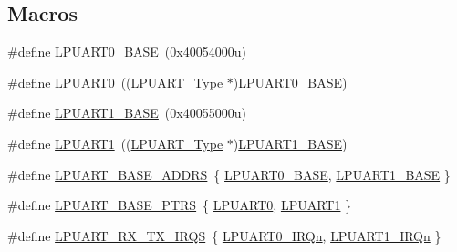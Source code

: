 \subsection*{Macros}
\begin{DoxyCompactItemize}
\item 
\#define \mbox{\hyperlink{group___l_p_u_a_r_t___peripheral___access___layer_ga8d65c662026d150cdf0aa1e586fde2cb}{L\+P\+U\+A\+R\+T0\+\_\+\+B\+A\+SE}}~(0x40054000u)
\item 
\#define \mbox{\hyperlink{group___l_p_u_a_r_t___peripheral___access___layer_ga5b2895bb50a19a21ddb954c28977629b}{L\+P\+U\+A\+R\+T0}}~((\mbox{\hyperlink{struct_l_p_u_a_r_t___type}{L\+P\+U\+A\+R\+T\+\_\+\+Type}} $\ast$)\mbox{\hyperlink{group___l_p_u_a_r_t___peripheral___access___layer_ga8d65c662026d150cdf0aa1e586fde2cb}{L\+P\+U\+A\+R\+T0\+\_\+\+B\+A\+SE}})
\item 
\#define \mbox{\hyperlink{group___l_p_u_a_r_t___peripheral___access___layer_ga42584c807077cea9525819eaf29c7e34}{L\+P\+U\+A\+R\+T1\+\_\+\+B\+A\+SE}}~(0x40055000u)
\item 
\#define \mbox{\hyperlink{group___l_p_u_a_r_t___peripheral___access___layer_ga73eb37d103f4e4f2d18ec3d3f5208ab9}{L\+P\+U\+A\+R\+T1}}~((\mbox{\hyperlink{struct_l_p_u_a_r_t___type}{L\+P\+U\+A\+R\+T\+\_\+\+Type}} $\ast$)\mbox{\hyperlink{group___l_p_u_a_r_t___peripheral___access___layer_ga42584c807077cea9525819eaf29c7e34}{L\+P\+U\+A\+R\+T1\+\_\+\+B\+A\+SE}})
\item 
\#define \mbox{\hyperlink{group___l_p_u_a_r_t___peripheral___access___layer_ga5c0c0d1905e4cb91614fe021176e8178}{L\+P\+U\+A\+R\+T\+\_\+\+B\+A\+S\+E\+\_\+\+A\+D\+D\+RS}}~\{ \mbox{\hyperlink{group___l_p_u_a_r_t___peripheral___access___layer_ga8d65c662026d150cdf0aa1e586fde2cb}{L\+P\+U\+A\+R\+T0\+\_\+\+B\+A\+SE}}, \mbox{\hyperlink{group___l_p_u_a_r_t___peripheral___access___layer_ga42584c807077cea9525819eaf29c7e34}{L\+P\+U\+A\+R\+T1\+\_\+\+B\+A\+SE}} \}
\item 
\#define \mbox{\hyperlink{group___l_p_u_a_r_t___peripheral___access___layer_ga23d9c24323d49602ca4e69ed873982de}{L\+P\+U\+A\+R\+T\+\_\+\+B\+A\+S\+E\+\_\+\+P\+T\+RS}}~\{ \mbox{\hyperlink{group___l_p_u_a_r_t___peripheral___access___layer_ga5b2895bb50a19a21ddb954c28977629b}{L\+P\+U\+A\+R\+T0}}, \mbox{\hyperlink{group___l_p_u_a_r_t___peripheral___access___layer_ga73eb37d103f4e4f2d18ec3d3f5208ab9}{L\+P\+U\+A\+R\+T1}} \}
\item 
\#define \mbox{\hyperlink{group___l_p_u_a_r_t___peripheral___access___layer_ga5fc5deafd2728edf687f15b780aa116b}{L\+P\+U\+A\+R\+T\+\_\+\+R\+X\+\_\+\+T\+X\+\_\+\+I\+R\+QS}}~\{ \mbox{\hyperlink{group___interrupt__vector__numbers_gga666eb0caeb12ec0e281415592ae89083a4a7d033e6cb46a64b460f9c2383e681e}{L\+P\+U\+A\+R\+T0\+\_\+\+I\+R\+Qn}}, \mbox{\hyperlink{group___interrupt__vector__numbers_gga666eb0caeb12ec0e281415592ae89083af5ac0e39fc168694d2b7d39018c6cc0a}{L\+P\+U\+A\+R\+T1\+\_\+\+I\+R\+Qn}} \}

\end{DoxyCompactItemize}
